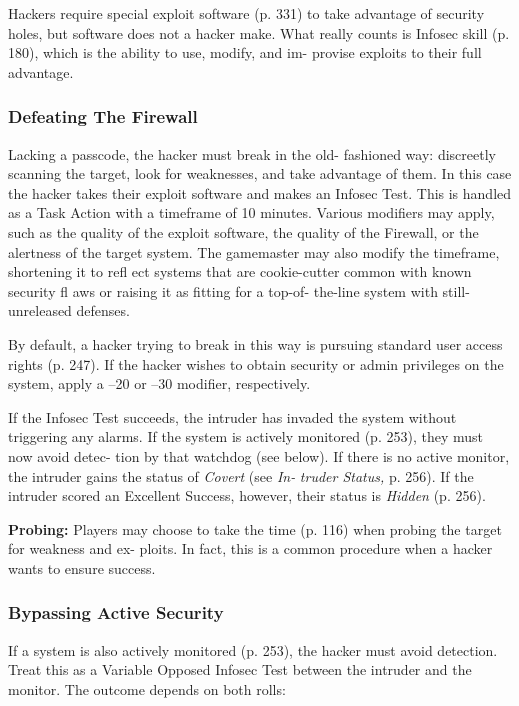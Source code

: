 Hackers require special exploit software (p. 331) to 
take advantage of security holes, but software does 
not a hacker make. What really counts is Infosec skill 
(p. 180), which is the ability to use, modify, and im-
provise exploits to their full advantage.

\subsubsection{Defeating The Firewall}

Lacking a passcode, the hacker must break in the old-
fashioned way: discreetly scanning the target, look for 
weaknesses, and take advantage of them. In this case 
the hacker takes their exploit software and makes an 
Infosec Test. This is handled as a Task Action with a 
timeframe of 10 minutes. Various modifiers may apply, 
such as the quality of the exploit software, the quality 
of the Firewall, or the alertness of the target system. The 
gamemaster may also modify the timeframe, shortening 
it to refl ect systems that are cookie-cutter common with 
known security fl aws or raising it as fitting for a top-of-
the-line system with still-unreleased defenses.

By default, a hacker trying to break in this way is 
pursuing standard user access rights (p. 247). If the 
hacker wishes to obtain security or admin privileges on 
the system, apply a –20 or –30 modifier, respectively.

If the Infosec Test succeeds, the intruder has invaded 
the system without triggering any alarms. If the system is 
actively monitored (p. 253), they must now avoid detec-
tion by that watchdog (see below). If there is no active 
monitor, the intruder gains the status of \textit{Covert} (see \textit{In-}
\textit{truder Status,} p. 256). If the intruder scored an Excellent 
Success, however, their status is \textit{Hidden }(p. 256).

\textbf{Probing:} Players may choose to take the time (p. 
116) when probing the target for weakness and ex-
ploits. In fact, this is a common procedure when a 
hacker wants to ensure success.

\subsubsection{Bypassing Active Security}

If a system is also actively monitored (p. 253), the 
hacker must avoid detection. Treat this as a Variable 
Opposed Infosec Test between the intruder and the 
monitor. The outcome depends on both rolls:

